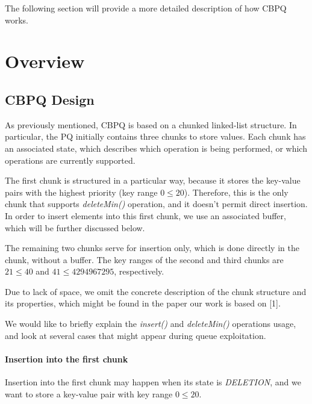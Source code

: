 \documentclass{article}
\begin{document}
  The following section will provide a more detailed description of how CBPQ works.

  \section{Overview}
  \subsection{CBPQ Design}

  As previously mentioned, CBPQ is based on a chunked linked-list structure. In particular, the PQ initially contains three chunks to store values. Each chunk has an associated state, which describes which operation is being performed, or which operations are currently supported.\par

  The first chunk is structured in a particular way, because it stores the key-value pairs with the highest priority (key range $0 \leqslant 20$). Therefore, this is the only chunk that supports \textit{deleteMin()} operation, and it doesn't permit direct insertion. In order to insert elements into this first chunk, we use an associated buffer, which will be further discussed below.\par

  The remaining two chunks serve for insertion only, which is done directly in the chunk, without a buffer. The key ranges of the second and third chunks are $21 \leqslant 40$ and $41 \leqslant 4294967295$, respectively.\par
  Due to lack of space, we omit the concrete description of the chunk structure and its properties, which might be found in the paper our work is based on [1].\par

  We would like to briefly explain the \textit{insert()} and \textit{deleteMin()} operations usage, and look at several cases that might appear during queue exploitation.

  \paragraph{Insertion into the first chunk}\mbox{}\par

  Insertion into the first chunk may happen when its state is \emph{DELETION}, and we want to store a key-value pair with key range $0 \leqslant 20$.\par
\end{document}
